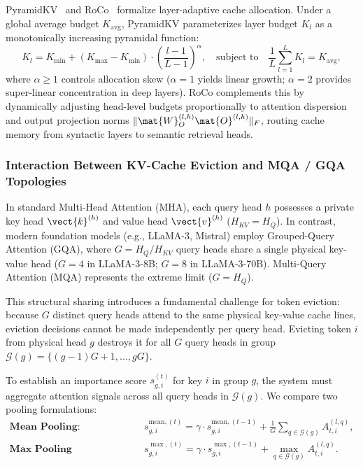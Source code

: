 PyramidKV~\cite{cai2024pyramidkv} and RoCo~\cite{yang2024roco} formalize layer-adaptive cache allocation. Under a global average budget $K_{\text{avg}}$, PyramidKV parameterizes layer budget $K_l$ as a monotonically increasing pyramidal function:
\begin{equation}
\label{eq:pyramidkv_equation}
K_l = K_{\min} + (K_{\max} - K_{\min}) \cdot \left( \frac{l - 1}{L - 1} \right)^\alpha, \quad \text{subject to} \quad \frac{1}{L} \sum_{l=1}^L K_l = K_{\text{avg}},
\end{equation}
where $\alpha \ge 1$ controls allocation skew ($\alpha = 1$ yields linear growth; $\alpha = 2$ provides super-linear concentration in deep layers). RoCo complements this by dynamically adjusting head-level budgets proportionally to attention dispersion and output projection norms $\|\mat{W}_O^{(l, h)} \mat{O}^{(l, h)}\|_F$, routing cache memory from syntactic layers to semantic retrieval heads.

\subsubsection{Interaction Between KV-Cache Eviction and MQA / GQA Topologies}
\label{sec:results_kv_gqa_interaction}

In standard Multi-Head Attention (MHA), each query head $h$ possesses a private key head $\vect{k}^{(h)}$ and value head $\vect{v}^{(h)}$ ($H_{KV} = H_Q$). In contrast, modern foundation models (e.g., LLaMA-3, Mistral) employ Grouped-Query Attention (GQA), where $G = H_Q / H_{KV}$ query heads share a single physical key-value head ($G=4$ in LLaMA-3-8B; $G=8$ in LLaMA-3-70B). Multi-Query Attention (MQA) represents the extreme limit ($G = H_Q$).

This structural sharing introduces a fundamental challenge for token eviction: because $G$ distinct query heads attend to the same physical key-value cache lines, eviction decisions cannot be made independently per query head. Evicting token $i$ from physical head $g$ destroys it for all $G$ query heads in group $\mathcal{G}(g) = \{(g-1)G+1, \dots, gG\}$.

To establish an importance score $s_{g, i}^{(t)}$ for key $i$ in group $g$, the system must aggregate attention signals across all query heads in $\mathcal{G}(g)$. We compare two pooling formulations:
\begin{align}
\label{eq:gqa_mean_pooling_formal}
\textbf{Mean Pooling:} \quad & s_{g, i}^{\text{mean},(t)} = \gamma \cdot s_{g, i}^{\text{mean},(t-1)} + \frac{1}{G} \sum_{q \in \mathcal{G}(g)} A_{t, i}^{(l, q)}, \\
\label{eq:gqa_max_pooling_formal}
\textbf{Max Pooling (Supremum):} \quad & s_{g, i}^{\max,(t)} = \gamma \cdot s_{g, i}^{\max,(t-1)} + \max_{q \in \mathcal{G}(g)} A_{t, i}^{(l, q)}.
\end{align}

